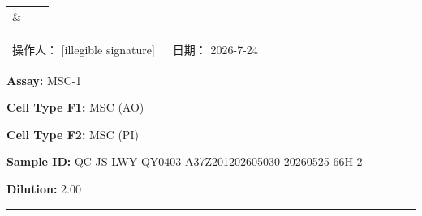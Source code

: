 \documentclass[UTF8,10pt,a4paper,fontset=fandol]{ctexart}
\newcommand{\fieldvalue}[1]{#1}
\newcommand{\handwritten}[1]{#1}
\begin{document}
\bigskip

\noindent
\begin{tabular}{@{}p{0.48\linewidth}p{0.48\linewidth}@{}}
\parbox[c][0.22\textheight][c]{\linewidth}{} &
\parbox[c][0.22\textheight][c]{\linewidth}{} \\[1em]
\parbox[c][0.22\textheight][c]{\linewidth}{} &
\parbox[c][0.22\textheight][c]{\linewidth}{} \\
\end{tabular}

\vfill

\noindent
\begin{tabular}{@{}p{0.48\linewidth}p{0.48\linewidth}@{}}
操作人：%
\fieldvalue{\handwritten{[illegible signature]}}
&
日期：%
\fieldvalue{\handwritten{2026-7-24}}
\end{tabular}

\newpage

\noindent\textbf{Assay:} %
\fieldvalue{MSC-1}

\vspace{0.5em}
\noindent\textbf{Cell Type F1:} %
\fieldvalue{MSC (AO)}

\noindent\textbf{Cell Type F2:} %
\fieldvalue{MSC (PI)}

\vspace{0.5em}
\noindent\textbf{Sample ID:} %
\fieldvalue{QC-JS-LWY-QY0403-A37Z201202605030-20260525-66H-2}

\noindent\textbf{Dilution:} %
\fieldvalue{2.00}

\vspace{0.75em}
\noindent\rule{\linewidth}{0.4pt}
\end{document}
